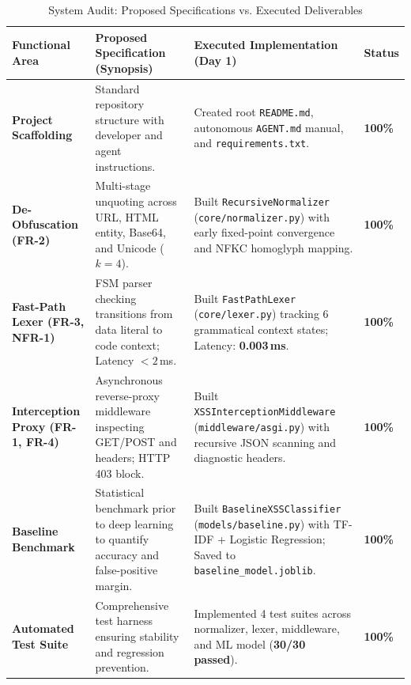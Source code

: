 \documentclass[11pt,a4paper]{article}
\begin{document}
\begin{table}[htbp]
\centering
\caption{System Audit: Proposed Specifications vs. Executed Deliverables}
\label{tab:proposed_vs_executed}
\vspace{0.4em}
\footnotesize
\begin{tabularx}{\textwidth}{>{\raggedright\arraybackslash}p{2.6cm} >{\raggedright\arraybackslash}p{4.6cm} >{\raggedright\arraybackslash}X >{\centering\arraybackslash}p{1.5cm}}
\toprule
\textbf{Functional Area} & \textbf{Proposed Specification (Synopsis)} & \textbf{Executed Implementation (Day 1)} & \textbf{Status} \\
\midrule
\textbf{Project Scaffolding} & Standard repository structure with developer and agent instructions. & Created root \texttt{README.md}, autonomous \texttt{AGENT.md} manual, and \texttt{requirements.txt}. & \textbf{100\%} \\
\addlinespace
\textbf{De-Obfuscation (FR-2)} & Multi-stage unquoting across URL, HTML entity, Base64, and Unicode ($k=4$). & Built \texttt{RecursiveNormalizer} (\texttt{core/normalizer.py}) with early fixed-point convergence and NFKC homoglyph mapping. & \textbf{100\%} \\
\addlinespace
\textbf{Fast-Path Lexer (FR-3, NFR-1)} & FSM parser checking transitions from data literal to code context; Latency $< 2$\,ms. & Built \texttt{FastPathLexer} (\texttt{core/lexer.py}) tracking 6 grammatical context states; Latency: \textbf{0.003\,ms}. & \textbf{100\%} \\
\addlinespace
\textbf{Interception Proxy (FR-1, FR-4)} & Asynchronous reverse-proxy middleware inspecting GET/POST and headers; HTTP 403 block. & Built \texttt{XSSInterceptionMiddleware} (\texttt{middleware/asgi.py}) with recursive JSON scanning and diagnostic headers. & \textbf{100\%} \\
\addlinespace
\textbf{Baseline Benchmark} & Statistical benchmark prior to deep learning to quantify accuracy and false-positive margin. & Built \texttt{BaselineXSSClassifier} (\texttt{models/baseline.py}) with TF-IDF + Logistic Regression; Saved to \texttt{baseline\_model.joblib}. & \textbf{100\%} \\
\addlinespace
\textbf{Automated Test Suite} & Comprehensive test harness ensuring stability and regression prevention. & Implemented 4 test suites across normalizer, lexer, middleware, and ML model (\textbf{30/30 passed}). & \textbf{100\%} \\
\bottomrule
\end{tabularx}
\end{table}
\end{document}

